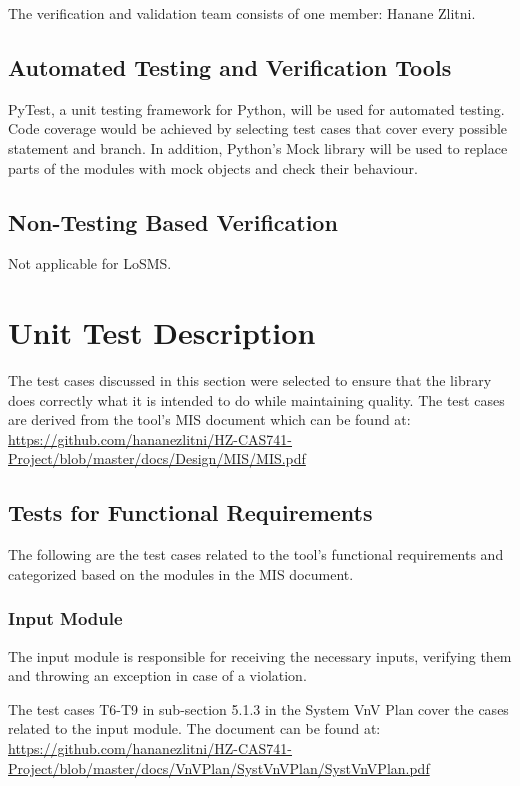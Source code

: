 \documentclass[12pt, titlepage]{article}
\newcommand{\famname}{LoSMS}
\begin{document}
The verification and validation team consists of one member: Hanane Zlitni.

\subsection{Automated Testing and Verification Tools}

PyTest, a unit testing framework for Python, will be used for automated 
testing. Code coverage would be achieved by selecting test cases that cover 
every possible statement and branch. In addition, Python's Mock library will be 
used to replace parts of the modules with mock objects and check their 
behaviour.

\subsection{Non-Testing Based Verification}

Not applicable for \famname{}.

\section{Unit Test Description} \label{UnitTestDescription}

The test cases discussed in this section were selected to ensure that the 
library does correctly what it is intended to do while maintaining quality. The 
test cases are derived from the tool's MIS document which can be found at: 
\url{https://github.com/hananezlitni/HZ-CAS741-Project/blob/master/docs/Design/MIS/MIS.pdf}

\subsection{Tests for Functional Requirements}

The following are the test cases related to the tool's functional requirements 
and categorized based on the modules in the MIS document.

\subsubsection{Input Module}

The input module is responsible for receiving the necessary inputs, verifying 
them and throwing an exception in case of a violation.

The test cases T6-T9 in sub-section 5.1.3 in the System VnV Plan cover the 
cases related to the input module. The document can be found at: 
\url{https://github.com/hananezlitni/HZ-CAS741-Project/blob/master/docs/VnVPlan/SystVnVPlan/SystVnVPlan.pdf}
\end{document}
